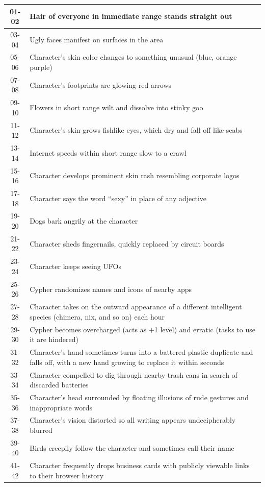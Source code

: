 \begin{longtable}{| c | p{15cm} |}
01-02 & Hair of everyone in immediate range stands straight out \\ \hline
03-04 & Ugly faces manifest on surfaces in the area \\ \hline
05-06 & Character’s skin color changes to something unusual (blue, orange purple) \\ \hline
07-08 & Character’s footprints are glowing red arrows \\ \hline
09-10 & Flowers in short range wilt and dissolve into stinky goo \\ \hline
11-12 & Character’s skin grows fishlike eyes, which dry and fall off like scabs \\ \hline
13-14 & Internet speeds within short range slow to a crawl \\ \hline
15-16 & Character develops prominent skin rash resembling corporate logos \\ \hline
17-18 & Character says the word “sexy” in place of any adjective \\ \hline
19-20 & Dogs bark angrily at the character \\ \hline
21-22 & Character sheds fingernails, quickly replaced by circuit boards \\ \hline
23-24 & Character keeps seeing UFOs \\ \hline
25-26 & Cypher randomizes names and icons of nearby apps \\ \hline
27-28 & Character takes on the outward appearance of a different intelligent species (chimera, nix, and so on) each hour \\ \hline
29-30 & Cypher becomes overcharged (acts as +1 level) and erratic (tasks to use it are hindered)  \\ \hline
31-32 & Character’s hand sometimes turns into a battered plastic duplicate and falls off, with a new hand growing to replace it within seconds \\ \hline
33-34 & Character compelled to dig through nearby trash cans in search of discarded batteries \\ \hline
35-36 & Character’s head surrounded by floating illusions of rude gestures and inappropriate words  \\ \hline
37-38 & Character’s vision distorted so all writing appears undecipherably blurred  \\ \hline
39-40 & Birds creepily follow the character and sometimes call their name  \\ \hline
41-42 & Character frequently drops business cards with publicly viewable links to their browser history  \\ \hline

\end{longtable}
